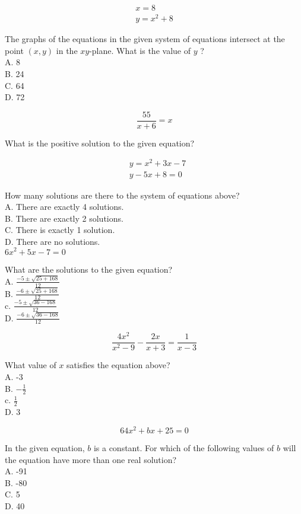 $$
\begin{gathered}
x=8 \\
y=x^{2}+8
\end{gathered}
$$

The graphs of the equations in the given system of equations intersect at the point $(x, y)$ in the $x y$-plane. What is the value of $y$ ?\\
A. 8\\
B. 24\\
C. 64\\
D. 72

$$
\frac{55}{x+6}=x
$$

What is the positive solution to the given equation?

$$
\begin{aligned}
& y=x^{2}+3 x-7 \\
& y-5 x+8=0
\end{aligned}
$$

How many solutions are there to the system of equations above?\\
A. There are exactly 4 solutions.\\
B. There are exactly 2 solutions.\\
C. There is exactly 1 solution.\\
D. There are no solutions.\\
$6 x^{2}+5 x-7=0$

What are the solutions to the given equation?\\
A. $\frac{-5 \pm \sqrt{25+168}}{12}$\\
B. $\frac{-6 \pm \sqrt{25+168}}{12}$\\
c. $\frac{-5 \pm \sqrt{36-168}}{12}$\\
D. $\frac{-6 \pm \sqrt{36-168}}{12}$

$$
\frac{4 x^{2}}{x^{2}-9}-\frac{2 x}{x+3}=\frac{1}{x-3}
$$

What value of $x$ satisfies the equation above?\\
A. -3\\
B. $-\frac{1}{2}$\\
c. $\frac{1}{2}$\\
D. 3

$$
64 x^{2}+b x+25=0
$$

In the given equation, $b$ is a constant. For which of the following values of $b$ will the equation have more than one real solution?\\
A. -91\\
B. -80\\
C. 5\\
D. 40

